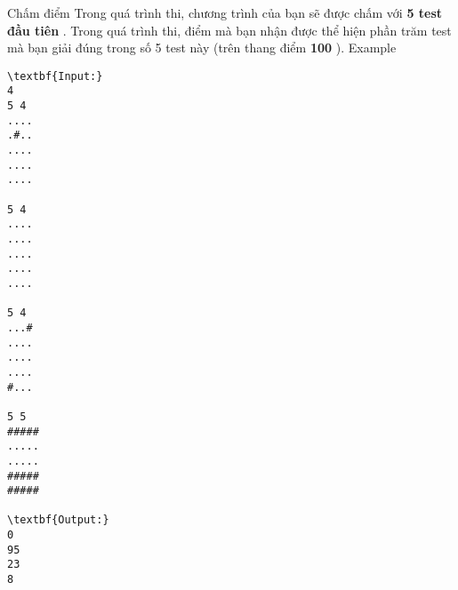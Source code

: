 Chấm điểm  
Trong quá trình thi, chương trình của bạn sẽ được chấm với   \textbf{    5 test đầu tiên   }   . Trong quá trình thi, điểm mà bạn nhận được thể hiện phần trăm test mà bạn giải đúng trong số 5 test này (trên thang điểm   \textbf{    100   }   ).
   Example  
\begin{verbatim}
\textbf{Input:}
4
5 4
....
.#..
....
....
....

5 4
....
....
....
....
....

5 4
...#
....
....
....
#...

5 5
#####
.....
.....
#####
#####

\textbf{Output:}
0
95
23
8
\end{verbatim}